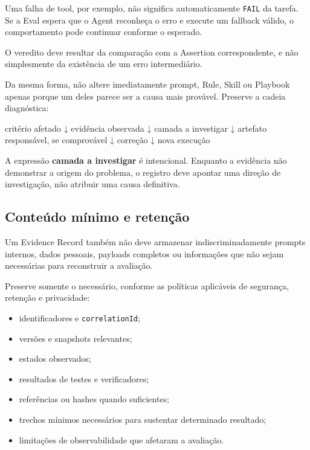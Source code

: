 \documentclass[
  10pt,
  a4paper,
  oneside]{book}
\newenvironment{Shaded}{}{}
\newcommand{\NormalTok}[1]{#1}
\providecommand{\tightlist}{%
  \setlength{\itemsep}{0pt}\setlength{\parskip}{0pt}}
\renewenvironment{Shaded}{\begin{snugshade}}{\end{snugshade}}%
\begin{document}
Uma falha de tool, por exemplo, não significa automaticamente
\texttt{FAIL} da tarefa. Se a Eval espera que o Agent reconheça o erro e
execute um fallback válido, o comportamento pode continuar conforme o
esperado.

O veredito deve resultar da comparação com a Assertion correspondente, e
não simplesmente da existência de um erro intermediário.

Da mesma forma, não altere imediatamente prompt, Rule, Skill ou Playbook
apenas porque um deles parece ser a causa mais provável. Preserve a
cadeia diagnóstica:

\begin{Shaded}
\begin{Highlighting}[]
\NormalTok{critério afetado}
\NormalTok{        ↓}
\NormalTok{evidência observada}
\NormalTok{        ↓}
\NormalTok{camada a investigar}
\NormalTok{        ↓}
\NormalTok{artefato responsável, se comprovável}
\NormalTok{        ↓}
\NormalTok{correção}
\NormalTok{        ↓}
\NormalTok{nova execução}
\end{Highlighting}
\end{Shaded}

A expressão \textbf{camada a investigar} é intencional. Enquanto a
evidência não demonstrar a origem do problema, o registro deve apontar
uma direção de investigação, não atribuir uma causa definitiva.

\hypertarget{conteuxfado-muxednimo-e-retenuxe7uxe3o}{%
\subsection{Conteúdo mínimo e
retenção}\label{conteuxfado-muxednimo-e-retenuxe7uxe3o}}

Um Evidence Record também não deve armazenar indiscriminadamente prompts
internos, dados pessoais, payloads completos ou informações que não
sejam necessárias para reconstruir a avaliação.

Preserve somente o necessário, conforme as políticas aplicáveis de
segurança, retenção e privacidade:

\begin{itemize}
\tightlist
\item
  identificadores e \texttt{correlationId};
\item
  versões e snapshots relevantes;
\item
  estados observados;
\item
  resultados de testes e verificadores;
\item
  referências ou hashes quando suficientes;
\item
  trechos mínimos necessários para sustentar determinado resultado;
\item
  limitações de observabilidade que afetaram a avaliação.
\end{itemize}
\end{document}

